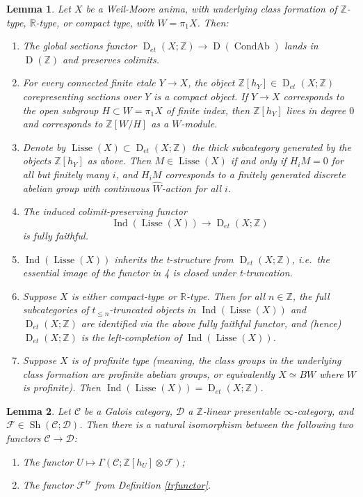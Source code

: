 \documentclass[10pt,a4paper]{amsart}
\newtheorem{lemma}{Lemma}
\newcommand{\mbb}{\mathbb}
\newcommand{\mc}{\mathcal}
\newcommand{\on}{\operatorname}
\newcommand{\wh}{\widehat}
\begin{document}
\begin{lemma}\label{lisse}
Let $X$ be a Weil-Moore anima, with underlying class formation of $\mbb{Z}$-type, $\mbb{R}$-type, or compact type, with $W=\pi_1X$.  Then:

\begin{enumerate}
\item The global sections functor $\on{D}_{et}(X;\mbb{Z}) \to \on{D}(\on{CondAb})$ lands in $\on{D}(\mbb{Z})$ and preserves colimits.
\item For every connected finite etale $Y\to X$, the object $\mbb{Z}[h_Y]\in \on{D}_{et}(X;\mbb{Z})$ corepresenting sections over $Y$ is a compact object.  If $Y\to X$ corresponds to the open subgroup $H\subset W=\pi_1X$ of finite index, then $\mbb{Z}[h_Y]$ lives in degree $0$ and corresponds to $\mbb{Z}[W/H]$ as a $W$-module.
\item Denote by $\on{Lisse}(X)\subset\on{D}_{et}(X;\mbb{Z})$ the thick subcategory generated by the objects $\mbb{Z}[h_Y]$ as above.  Then $M\in\on{Lisse}(X)$ if and only if $H_iM=0$ for all but finitely many $i$, and $H_iM$ corresponds to a finitely generated discrete abelian group with continuous $\wh{W}$-action for all $i$.

\item The induced colimit-preserving functor
$$\on{Ind}(\on{Lisse}(X))\to \on{D}_{et}(X;\mbb{Z})$$
is fully faithful.
\item $\on{Ind}(\on{Lisse}(X))$ inherits the t-structure from $\on{D}_{et}(X;\mbb{Z})$, i.e.\ the essential image of the functor in 4 is closed under t-truncation.
\item Suppose $X$ is either compact-type or $\mbb{R}$-type.  Then for all $n\in\mbb{Z}$, the full subcategories of $t_{\leq n}$-truncated objects in $\on{Ind}(\on{Lisse}(X))$ and $\on{D}_{et}(X;\mbb{Z})$ are identified via the above fully faithful functor, and (hence) $\on{D}_{et}(X;\mbb{Z})$ is the left-completion of $\on{Ind}(\on{Lisse}(X))$.
\item Suppose $X$ is of profinite type (meaning, the class groups in the underlying class formation are profinite abelian groups, or equivalently $X\simeq BW$ where $W$ is profinite).  Then $\on{Ind}(\on{Lisse}(X))=\on{D}_{et}(X;\mbb{Z})$.
\end{enumerate}

\end{lemma}

\begin{lemma}\label{alttr}
Let $\mc{C}$ be a Galois category, $\mc{D}$ a $\mbb{Z}$-linear presentable $\infty$-category, and $\mc{F}\in\on{Sh}(\mc{C};\mc{D})$.  Then there is a natural isomorphism between the following two functors $\mc{C}\to\mc{D}$:
\begin{enumerate}
\item The functor $U\mapsto \Gamma(\mc{C};\mbb{Z}[h_U]\otimes\mc{F})$;
\item The functor $\mc{F}^{tr}$ from Definition \ref{trfunctor}.
\end{enumerate}
\end{lemma}
\end{document}
